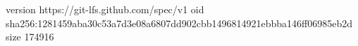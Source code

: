 version https://git-lfs.github.com/spec/v1
oid sha256:1281459aba30c53a7d3e08a6807dd902cbb1496814921ebbba146ff06985eb2d
size 174916
